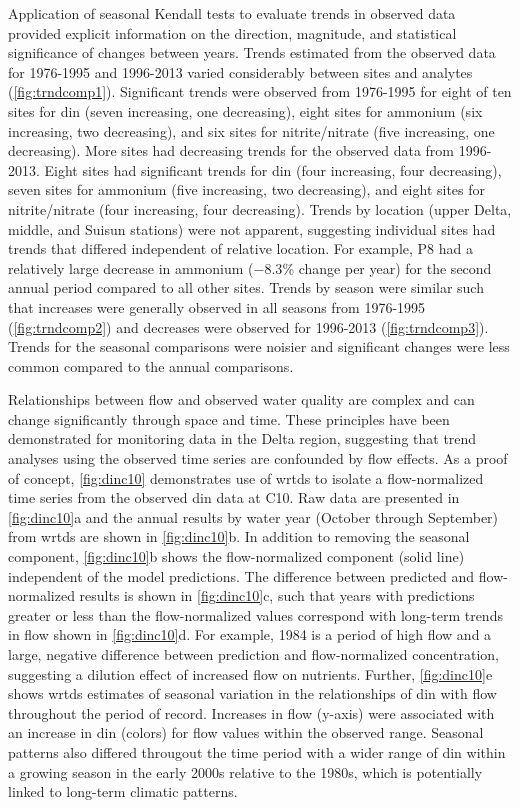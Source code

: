\documentclass[journal = esthag, manuscript = article]{achemso}\usepackage[]{graphicx}\usepackage[]{color}
\begin{document}
Application of seasonal Kendall tests to evaluate trends in observed data provided explicit information on the direction, magnitude, and statistical significance of changes between years. Trends estimated from the observed data for 1976-1995 and 1996-2013 varied considerably between sites and analytes (\cref{fig:trndcomp1}). Significant trends were observed from 1976-1995 for eight of ten sites for \ac{din} (seven increasing, one decreasing), eight sites for ammonium (six increasing, two decreasing), and six sites for nitrite/nitrate (five increasing, one decreasing).  More sites had decreasing trends for the observed data from 1996-2013.  Eight sites had significant trends for \ac{din} (four increasing, four decreasing), seven sites for ammonium (five increasing, two decreasing), and eight sites for nitrite/nitrate (four increasing, four decreasing). Trends by location (upper Delta, middle, and Suisun stations) were not apparent, suggesting individual sites had trends that differed independent of relative location.  For example, P8 had a relatively large decrease in ammonium ($-8.3$\% change per year) for the second annual period compared to all other sites. Trends by season were similar such that increases were generally observed in all seasons from 1976-1995 (\cref{fig:trndcomp2}) and decreases were observed for 1996-2013 (\cref{fig:trndcomp3}).  Trends for the seasonal comparisons were noisier and significant changes were less common compared to the annual comparisons.

Relationships between flow and observed water quality are complex and can change significantly through space and time\cite{Hirsch10,Zhang16}. These principles have been demonstrated for monitoring data in the Delta region\cite{Jassby08,Novick15,Jabusch16}, suggesting that trend analyses using the observed time series are confounded by flow effects. As a proof of concept, \cref{fig:dinc10} demonstrates use of \ac{wrtds} to isolate a flow-normalized time series from the observed \ac{din} data at C10. Raw data are presented in \cref{fig:dinc10}a and the annual results by water year (October through September) from \ac{wrtds} are shown in \cref{fig:dinc10}b. In addition to removing the seasonal component, \cref{fig:dinc10}b shows the flow-normalized component (solid line) independent of the model predictions.  The difference between predicted and flow-normalized results is shown in \cref{fig:dinc10}c, such that years with predictions greater or less than the flow-normalized values correspond with long-term trends in flow shown in \cref{fig:dinc10}d.  For example, 1984 is a period of high flow and a large, negative difference between prediction and flow-normalized concentration, suggesting a dilution effect of increased flow on nutrients. Further, \cref{fig:dinc10}e shows \ac{wrtds} estimates of seasonal variation in the relationships of \ac{din} with flow throughout the period of record. Increases in flow (y-axis) were associated with an increase in \ac{din} (colors) for flow values within the observed range.  Seasonal patterns also differed througout the time period with a wider range of \ac{din} within a growing season in the early 2000s relative to the 1980s, which is potentially linked to long-term climatic patterns\cite{Cloern07}. 
\end{document}
